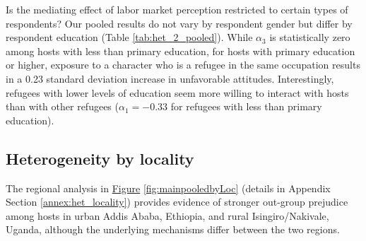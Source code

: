 \documentclass[a4paper,12pt]{article}
\begin{document}
Is the mediating effect of labor market perception restricted to certain types of respondents? Our pooled results do not vary by respondent gender but differ by respondent education (Table \ref{tab:het_2_pooled}). While  $\alpha_{3}$ is statistically zero among hosts with less than primary education, for hosts with primary education or higher, exposure to a character who is a refugee in the same occupation results in a 0.23 standard deviation increase in unfavorable attitudes. Interestingly, refugees with lower levels of education seem more willing to interact with hosts than with other refugees ($\alpha_{1} = -0.33$ for refugees with less than primary education).


\subsection*{Heterogeneity by locality}

The regional analysis in \hyperref[fig:mainpooledbyLoc]{Figure} \ref{fig:mainpooledbyLoc} (details in Appendix Section \ref{annex:het_locality}) provides evidence of stronger out-group prejudice among hosts in urban Addis Ababa, Ethiopia, and rural Isingiro/Nakivale, Uganda, although the underlying mechanisms differ between the two regions.
\end{document}
